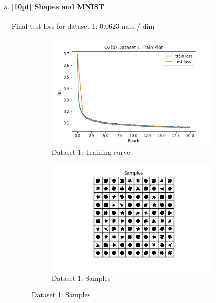 \documentclass{article}
\begin{document}
\begin{enumerate}[(a)]
\newpage
\item {\bf [10pt] Shapes and MNIST} \\\\
Final test loss for dataset 1: 0.0623  nats / dim
\begin{figure}[H]
    \centering
    \begin{subfigure}{0.45\textwidth}
        \centering
        \includegraphics[width=\textwidth]{figures/q2_b_dset1_train_plot.png}
        \caption{Dataset 1: Training curve}
    \end{subfigure}
    \hspace{0.2in}
    \begin{subfigure}{0.45\textwidth}
        \centering
        \includegraphics[width=\textwidth]{figures/q2_b_dset1_samples.png}
        \caption{Dataset 1: Samples}
    \end{subfigure}
\end{figure}

\end{enumerate}
\end{document}
